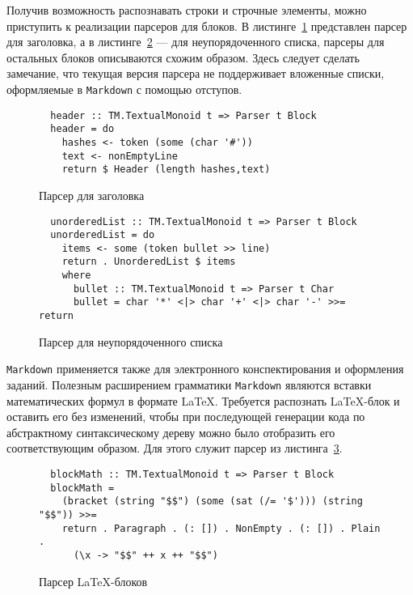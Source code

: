   Получив возможность распознавать строки и строчные элементы, можно приступить к реализации парсеров для блоков. В листинге~\ref{listing:MarkdownHeader} представлен парсер для заголовка, а в листинге~\ref{listing:markdownUlist} --- для неупорядоченного списка, парсеры для остальных блоков описываются схожим образом. Здесь следует сделать замечание, что текущая версия парсера не поддерживает вложенные списки, оформляемые в \lstinline{Markdown} с помощью отступов.

  \begin{figure}[t]
  \begin{lstlisting}
  header :: TM.TextualMonoid t => Parser t Block
  header = do
    hashes <- token (some (char '#'))
    text <- nonEmptyLine
    return $ Header (length hashes,text)
  \end{lstlisting}
  \caption{Парсер для заголовка}
  \label{listing:MarkdownHeader}
  \end{figure}

  \begin{figure}[t]
  \begin{lstlisting}
  unorderedList :: TM.TextualMonoid t => Parser t Block
  unorderedList = do
    items <- some (token bullet >> line)
    return . UnorderedList $ items
    where
      bullet :: TM.TextualMonoid t => Parser t Char
      bullet = char '*' <|> char '+' <|> char '-' >>= return
  \end{lstlisting}
  \caption{Парсер для неупорядоченного списка}
  \label{listing:markdownUlist}
  \end{figure}

  \lstinline{Markdown} применяется также для электронного конспектирования и
  оформления заданий. Полезным расширением грамматики \lstinline{Markdown}
  являются вставки математических формул в формате \LaTeX. Требуется распознать
  \LaTeX-блок и оставить его без изменений, чтобы при последующей генерации кода
  по абстрактному синтаксическому дереву можно было отобразить его соответствующим
  образом. Для этого служит парсер из листинга~\ref{listing:MarkdownLaTeX}.

  \begin{figure}[h]
  \begin{lstlisting}
  blockMath :: TM.TextualMonoid t => Parser t Block
  blockMath =
    (bracket (string "$$") (some (sat (/= '$'))) (string "$$")) >>=
    return . Paragraph . (: []) . NonEmpty . (: []) . Plain .
      (\x -> "$$" ++ x ++ "$$")
  \end{lstlisting}
  \caption{Парсер \LaTeX-блоков}
  \label{listing:MarkdownLaTeX}
  \end{figure}

